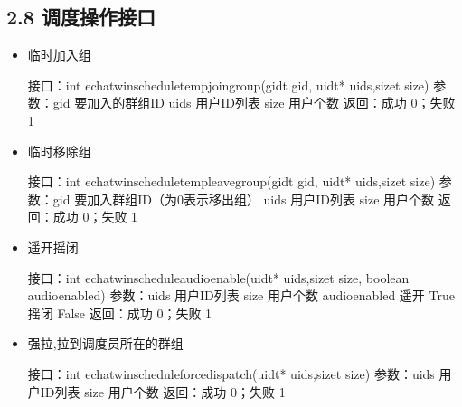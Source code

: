 \documentclass[letterpaper,10pt,english]{sphinxmanual}
\begin{document}
\subsection{2.8 调度操作接口}
\label{\detokenize{c_win:id10}}\begin{itemize}
\item {} 
临时加入组

%
\begin{sphinxVerbatim}[commandchars=\\\{\}]
接口：int echat\PYGZus{}win\PYGZus{}schedule\PYGZus{}temp\PYGZus{}join\PYGZus{}group(gid\PYGZus{}t gid, uid\PYGZus{}t* uids,size\PYGZus{}t size)
参数：gid  要加入的群组ID
  uids  用户ID列表
  size  用户个数
返回：成功 0；失败 \PYGZhy{}1
\end{sphinxVerbatim}

\item {} 
临时移除组

%
\begin{sphinxVerbatim}[commandchars=\\\{\}]
接口：int echat\PYGZus{}win\PYGZus{}schedule\PYGZus{}temp\PYGZus{}leave\PYGZus{}group(gid\PYGZus{}t gid, uid\PYGZus{}t* uids,size\PYGZus{}t size)
参数：gid  要加入群组ID（为0表示移出组）
  uids  用户ID列表
  size  用户个数
返回：成功 0；失败 \PYGZhy{}1
\end{sphinxVerbatim}

\item {} 
遥开摇闭

%
\begin{sphinxVerbatim}[commandchars=\\\{\}]
接口：int echat\PYGZus{}win\PYGZus{}schedule\PYGZus{}audioenable(uid\PYGZus{}t* uids,size\PYGZus{}t size, boolean audioenabled)
参数：uids  用户ID列表
  size  用户个数
  audioenabled  遥开 True  摇闭  False
返回：成功 0；失败 \PYGZhy{}1
\end{sphinxVerbatim}

\item {} 
强拉,拉到调度员所在的群组

%
\begin{sphinxVerbatim}[commandchars=\\\{\}]
接口：int echat\PYGZus{}win\PYGZus{}schedule\PYGZus{}force\PYGZus{}dispatch(uid\PYGZus{}t* uids,size\PYGZus{}t size)
参数：uids  用户ID列表
  size  用户个数
返回：成功 0；失败 \PYGZhy{}1
\end{sphinxVerbatim}


\end{itemize}
\end{document}
